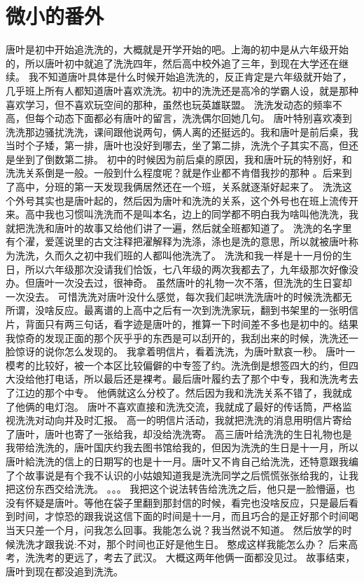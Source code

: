 \chapter{微小的番外\kaomojihide}
唐叶是初中开始追洗洗的，大概就是开学开始的吧。上海的初中是从六年级开始的，所以唐叶初中就追了洗洗四年，然后高中校外追了三年，到现在大学还在继续。
我不知道唐叶具体是什么时候开始追洗洗的，反正肯定是六年级就开始了，几乎班上所有人都知道唐叶喜欢洗洗。初中的洗洗还是高冷的学霸人设，就是那种喜欢学习，但不喜欢玩空间的那种，虽然也玩英雄联盟。
洗洗发动态的频率不高，但每个动态下面都必有唐叶的留言，洗洗偶尔回她几句。
唐叶特别喜欢凑到洗洗那边骚扰洗洗，课间跟他说两句，俩人离的还挺远的。我和唐叶是前后桌，我当时个子矮，第一排，唐叶也没好到哪去，坐了第二排，洗洗个子其实不高，但还是坐到了倒数第二排。
初中的时候因为前后桌的原因，我和唐叶玩的特别好，和洗洗关系倒是一般。一般到什么程度呢？就是作业都不肯借我抄的那种 。后来到了高中，分班的第一天发现我俩居然还在一个班，关系就逐渐好起来了。
洗洗这个外号其实也是唐叶起的，然后因为唐叶和洗洗的关系，这个外号也在班上流传开来。高中我也习惯叫洗洗而不是叫本名，边上的同学都不明白我为啥叫他洗洗，我就把洗洗和唐叶的故事又给他们讲了一遍，然后就全班都知道了。
洗洗的名字里有个濯，爱莲说里的古文注释把濯解释为洗涤，涤也是洗的意思，所以就被唐叶称为洗洗，久而久之初中我们班的人都叫他洗洗了。
洗洗和我一样是十一月份的生日，所以六年级那次没请我们恰饭，七八年级的两次我都去了，九年级那次好像没办。但唐叶一次没去过，很神奇。
虽然唐叶的礼物一次不落，但洗洗的生日宴却一次没去。
可惜洗洗对唐叶没什么感觉，每次我们起哄洗洗唐叶的时候洗洗都无所谓，没啥反应。最离谱的上高中之后有一次到洗洗家玩，翻到书架里的一张明信片，背面只有两三句话，看字迹是唐叶的，推算一下时间差不多也是初中的。结果我惊奇的发现正面的那个灰乎乎的东西是可以刮开的，我刮出来的时候，洗洗还一脸惊讶的说你怎么发现的。
我拿着明信片，看着洗洗，为唐叶默哀一秒。
唐叶一模考的比较好，被一个本区比较偏僻的中专签了约。洗洗倒是想签四大的约，但四大没给他打电话，所以最后还是裸考。最后唐叶履约去了那个中专，我和洗洗考去了江边的那个中专。
他俩就这么分校了。然后因为我和洗洗关系不错了，我就成了他俩的电灯泡。
唐叶不喜欢直接和洗洗交流，我就成了最好的传话筒，严格监视洗洗对动向并及时汇报。
高一的明信片活动，我就把洗洗的消息用明信片寄给了唐叶，唐叶也寄了一张给我，却没给洗洗寄。
高三唐叶给洗洗的生日礼物也是我带给洗洗的，唐叶国庆约我去图书馆给我的，但因为洗洗的生日是十一月，所以唐叶給洗洗的信上的日期写的也是十一月。唐叶又不肯自己给洗洗，还特意跟我编了个故事说是有个我不认识的小姑娘知道我是洗洗同学之后慌慌张张给我的，让我把这份东西交给洗洗。
。。。
我把这个说法转告给洗洗之后，他只是一脸懵逼，也没有怀疑是唐叶。等他在袋子里翻到那封信的时候，看完也没啥反应，只是最后看到时间，才惊恐的跟我说这信下面的时间是十一月，而且巧合的是正好那个时间喝当天只差一个月，问我怎么回事。我能怎么说？我当然说不知道。
然后放学的时候洗洗才跟我说:不对，那个时间也正好是他生日。
憨成这样我能怎么办？
后来高考，洗洗考的更远了，考去了武汉。
大概这两年他俩一面都没见过。
故事结束，唐叶到现在都没追到洗洗。

